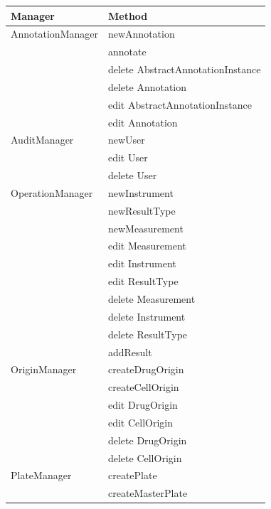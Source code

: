 \documentclass[a4paper,10pt]{article}
\begin{document}
	\begin{table}[hbt]
	
	\begin{center}
    \footnotesize{
	\begin{tabular}{|l|l|}
       	
    		\hline
    		\textbf{Manager} & \textbf{Method} \\
    		\hline
    		\hline
				AnnotationManager & newAnnotation \\
				                  & annotate \\
				                  & delete AbstractAnnotationInstance \\
				                  & delete Annotation \\
				                  & edit AbstractAnnotationInstance \\
				                  & edit Annotation \\
    		\hline
				AuditManager & newUser \\
				             & edit User \\
				             & delete User \\
    		\hline
				OperationManager & newInstrument \\
				                 & newResultType \\
				                 & newMeasurement \\
				                 & edit Measurement \\
				                 & edit Instrument \\
				                 & edit ResultType \\
				                 & delete Measurement \\
				                 & delete Instrument \\
				                 & delete ResultType \\
 				                 & addResult \\
    		\hline
    			OriginManager & createDrugOrigin \\
    			              & createCellOrigin \\
    			              & edit DrugOrigin \\
    			              & edit CellOrigin \\
    			              & delete DrugOrigin \\
    			              & delete CellOrigin \\
    		\hline
    			PlateManager & createPlate \\
    			             & createMasterPlate \\

\end{tabular}}
\end{center}
\end{table}
\end{document}
